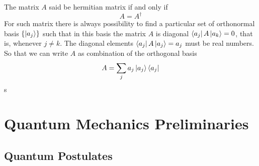 \begin{defn}

The matrix  $A$ said be  hermitian  matrix if and only if  $$A=A^\dagger$$
 For such matrix there is always possibility to find a particular  set of orthonormal basis  $\{\ket{a_j}\}$ such that in this basis the matrix $A$ is diagonal $\bra{a_j}A\ket{a_k}=0$, that is,   whenever $j\neq k$. The diagonal elements $\bra{a_j}A\ket{a_j}=a_j$ must be real numbers.
So that we can write $A$ as combination of the orthogonal basis
$$A=\sum_j a_j \ket{a_j} \bra{a_j}$$s
\end{defn}

\section{ Quantum Mechanics Preliminaries }
\subsection{Quantum Postulates}


